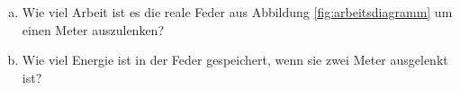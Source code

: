 
\begin{aufgabe}
	\begin{enumerate}[a)]
		\item	Wie viel Arbeit ist es die reale Feder aus Abbildung \ref{fig:arbeitsdiagramm} um einen Meter auszulenken?
		\item Wie viel Energie ist in der Feder gespeichert, wenn sie zwei Meter ausgelenkt ist?
	\end{enumerate}
\end{aufgabe}

\begin{loesung}

\end{loesung}
